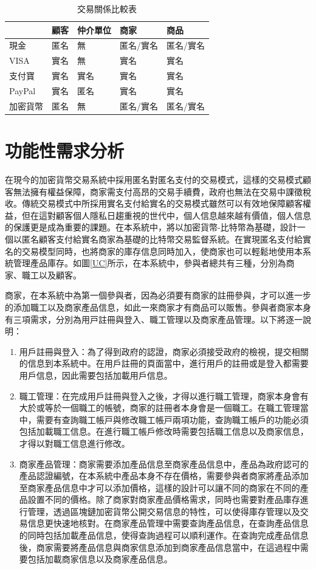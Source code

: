 		\begin{table}[!htbp]
		\centering
		\caption{交易關係比較表}
		\label{txvs}
		\begin{tabular}{|l|l|l|l|l|}
		\hline
		 & 顧客 & 仲介單位 & 商家 & 商品 \\ \hline
		現金 & 匿名 & 無 & 匿名/實名 & 匿名/實名 \\ \hline
		VISA & 實名 & 無 & 實名 & 實名 \\ \hline
		支付寶 & 實名 & 實名 & 實名 & 實名 \\ \hline
		PayPal & 實名 & 匿名 & 實名 & 實名 \\ \hline
		加密貨幣 & 匿名 & 無 & 匿名/實名 & 匿名/實名 \\ \hline
		\end{tabular}
		\end{table}

\section{功能性需求分析}

在現今的加密貨幣交易系統中採用匿名對匿名⽀付的交易模式，這樣的交易模式顧客無法擁有權益保障，商家需支付高昂的交易手續費，政府也無法在交易中課徵稅收。傳統交易模式中所採用實名⽀付給實名的交易模式雖然可以有效地保障顧客權益，但在這對顧客個⼈隱私⽇趨重視的世代中，個⼈信息越來越有價值，個⼈信息的保護更是成為重要的課題。在本系統中，將以加密貨幣-⽐特幣為基礎，設計⼀個以匿名顧客⽀付給實名商家為基礎的比特幣交易監督系統。在實現匿名⽀付給實名的交易模型同時，也將商家的庫存信息同時加⼊，使商家也可以輕鬆地使用本系統管理產品庫存。如圖\ref{UC}所示，在本系統中，參與者總共有三種，分別為商家、職⼯以及顧客。

商家，在本系統中為第⼀個參與者，因為必須要有商家的註冊參與，才可以進⼀步的添加職⼯以及商家產品信息，如此⼀來商家才有商品可以販售。參與者商家本⾝有三項需求，分別為⽤⼾註冊與登⼊、職⼯管理以及商家產品管理。以下將逐⼀說明：


	\begin{enumerate}
	\item 用戶註冊與登入：為了得到政府的認證，商家必須接受政府的檢視，提交相關的信息到本系統中。在用戶註冊的頁面當中，進行用戶的註冊或是登入都需要用戶信息，因此需要包括加載用戶信息。
	\item 職工管理：在完成用戶註冊與登入之後，才得以進行職工管理，商家本身會有大於或等於一個職工的帳號，商家的註冊者本身會是一個職工。在職工管理當中，需要有查詢職⼯帳⼾與修改職⼯帳⼾兩項功能，查詢職工帳戶的功能必須包括加載職工信息。在進行職工帳戶修改時需要包括職工信息以及商家信息，才得以對職工信息進行修改。
	\item 商家產品管理：商家需要添加產品信息至商家產品信息中，產品為政府認可的產品認證編號，在本系統中產品本身不存在價格，需要參與者商家將產品添加至商家產品信息中才可以添加價格，這樣的設計可以讓不同的商家在不同的產品設置不同的價格。除了商家對商家產品價格需求，同時也需要對產品庫存進行管理，透過區塊鏈加密貨幣公開交易信息的特性，可以使得庫存管理以及交易信息更快速地核對。在商家產品管理中需要查詢產品信息，在查詢產品信息的同時包括加載產品信息，使得查詢過程可以順利運作。在查詢完成產品信息後，商家需要將產品信息與商家信息添加到商家產品信息當中，在這過程中需要包括加載商家信息以及商家產品信息。

	\end{enumerate}

